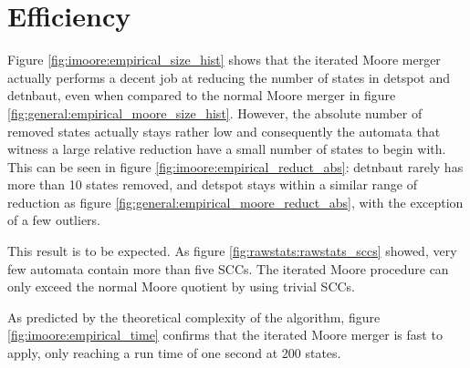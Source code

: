 \section{Efficiency}
Figure \ref{fig:imoore:empirical_size_hist} shows that the iterated Moore merger actually performs a decent job at reducing the number of states in \textsf{detspot} and \textsf{detnbaut}, even when compared to the normal Moore merger in figure \ref{fig:general:empirical_moore_size_hist}. However, the absolute number of removed states actually stays rather low and consequently the automata that witness a large relative reduction have a small number of states to begin with. This can be seen in figure \ref{fig:imoore:empirical_reduct_abs}: \textsf{detnbaut} rarely has more than 10 states removed, and \textsf{detspot} stays within a similar range of reduction as figure \ref{fig:general:empirical_moore_reduct_abs}, with the exception of a few outliers.

This result is to be expected. As figure \ref{fig:rawstats:rawstats_sccs} showed, very few automata contain more than five SCCs. The iterated Moore procedure can only exceed the normal Moore quotient by using trivial SCCs.

As predicted by the theoretical complexity of the algorithm, figure \ref{fig:imoore:empirical_time} confirms that the iterated Moore merger is fast to apply, only reaching a run time of one second at 200 states.


